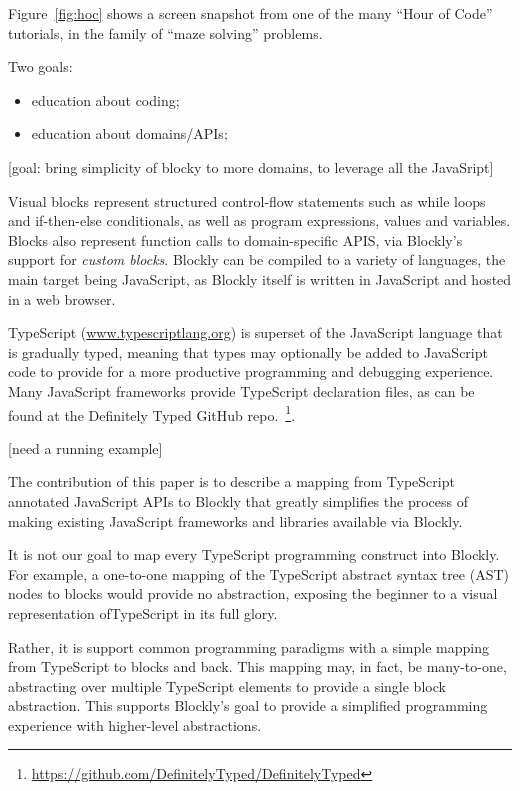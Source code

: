 Figure~\ref{fig:hoc} shows a screen snapshot from one of the many 
``Hour of Code'' tutorials, in the family of ``maze solving'' problems.

Two goals: 
\begin{itemize}
    \item education about coding; 
    \item education about domains/APIs;
\end{itemize}


[goal: bring simplicity of blocky to more domains, to leverage all the JavaSript]

Visual blocks represent structured control-flow statements such as while loops 
and if-then-else conditionals, as well as program expressions, values and variables. 
Blocks also represent function calls to domain-specific APIS, via Blockly's support for \emph{custom 
blocks}. Blockly can be compiled to a variety of languages, the main target 
being JavaScript, as Blockly itself is written in JavaScript and hosted in a web browser.

TypeScript (\url{www.typescriptlang.org}) is superset of the JavaScript language that is gradually typed, 
meaning that types may optionally be added to JavaScript code to provide for a more productive programming 
and debugging experience.  Many JavaScript frameworks provide TypeScript declaration files, as
can be found at the Definitely Typed GitHub repo.~\footnote{\url{https://github.com/DefinitelyTyped/DefinitelyTyped}}.

[need a running example]

The contribution of this paper is to describe a mapping from TypeScript annotated 
JavaScript APIs to Blockly that greatly simplifies 
the process of making existing JavaScript frameworks and libraries available via Blockly.

It is not our goal to map every TypeScript programming construct into Blockly.
For example, a one-to-one mapping of the TypeScript abstract syntax tree (AST) 
nodes to blocks would provide no abstraction, exposing the beginner to a visual 
representation ofTypeScript in its full glory.

Rather, it is support common programming paradigms with a simple mapping
from TypeScript to blocks and back.  This mapping may, in fact, be many-to-one, 
abstracting over multiple TypeScript elements to provide a single block abstraction.
This supports Blockly's goal to provide a simplified programming experience 
with higher-level abstractions. 

